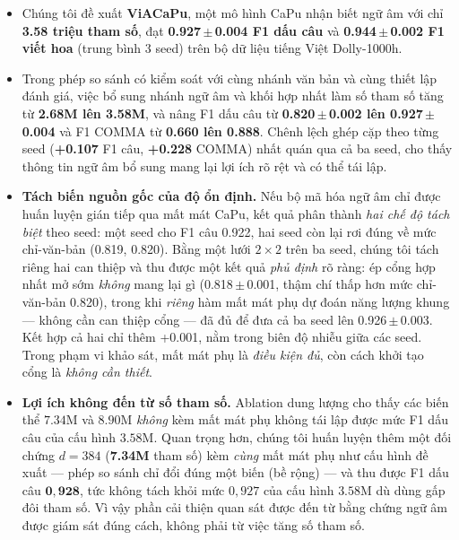 \documentclass[conference,onecolumn]{IEEEtran}
\begin{document}
\begin{itemize}
    \item Chúng tôi đề xuất \textbf{ViACaPu}, một mô hình CaPu nhận biết ngữ âm
    với chỉ \textbf{3.58 triệu tham số}, đạt \textbf{0.927\,$\pm$\,0.004 F1 dấu câu}
    và \textbf{0.944\,$\pm$\,0.002 F1 viết hoa} (trung bình 3 seed) trên bộ dữ liệu
    tiếng Việt Dolly-1000h.

    \item Trong phép so sánh có kiểm soát với cùng nhánh văn bản và cùng thiết
    lập đánh giá, việc bổ sung nhánh ngữ âm và khối hợp nhất làm số tham số tăng
    từ \textbf{2.68M lên 3.58M}, và nâng F1 dấu câu từ
    \textbf{0.820\,$\pm$\,0.002 lên 0.927\,$\pm$\,0.004} và F1 COMMA từ
    \textbf{0.660 lên 0.888}. Chênh lệch ghép cặp theo từng seed
    (\textbf{+0.107} F1 câu, \textbf{+0.228} COMMA) nhất quán qua cả ba seed, cho
    thấy thông tin ngữ âm bổ sung mang lại lợi ích rõ rệt và có thể tái lập.

    \item \textbf{Tách biến nguồn gốc của độ ổn định.} Nếu bộ mã hóa ngữ âm chỉ
    được huấn luyện gián tiếp qua mất mát CaPu, kết quả phân thành \emph{hai chế
    độ tách biệt} theo seed: một seed cho F1 câu 0.922, hai seed còn lại rơi đúng
    về mức chỉ-văn-bản (0.819, 0.820). Bằng một lưới $2\times2$ trên ba seed, chúng
    tôi tách riêng hai can thiệp và thu được một kết quả \emph{phủ định} rõ ràng:
    ép cổng hợp nhất mở sớm \emph{không} mang lại gì (0.818\,$\pm$\,0.001, thậm chí
    thấp hơn mức chỉ-văn-bản 0.820), trong khi \emph{riêng} hàm mất mát phụ dự đoán
    năng lượng khung --- không cần can thiệp cổng --- đã đủ để đưa cả ba seed lên
    0.926\,$\pm$\,0.003. Kết hợp cả hai chỉ thêm +0.001, nằm trong biên độ nhiễu
    giữa các seed. Trong phạm vi khảo sát, mất mát phụ là \emph{điều kiện đủ}, còn
    cách khởi tạo cổng là \emph{không cần thiết}.

    \item \textbf{Lợi ích không đến từ số tham số.} Ablation dung lượng cho
    thấy các biến thể $7.34$M và $8.90$M \emph{không} kèm mất mát phụ không
    tái lập được mức F1 dấu câu của cấu hình $3.58$M. Quan trọng hơn, chúng
    tôi huấn luyện thêm một đối chứng $d{=}384$ (\textbf{7.34M} tham số) kèm
    \emph{cùng} mất mát phụ như cấu hình đề xuất --- phép so sánh chỉ đổi đúng
    một biến (bề rộng) --- và thu được F1 dấu câu $\mathbf{0{,}928}$, tức không
    tách khỏi mức $0{,}927$ của cấu hình $3.58$M dù dùng gấp đôi tham số. Vì
    vậy phần cải thiện quan sát được đến từ bằng chứng ngữ âm được giám sát
    đúng cách, không phải từ việc tăng số tham số.
\end{itemize}
\end{document}
